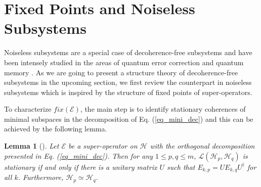 \documentclass[journal]{IEEEtran}
\def\h{\ensuremath{\mathcal{H}}}
\def\l{\ensuremath{\mathcal{L}}}
\def\e{\ensuremath{\mathcal{E}}}
\def\l{\ensuremath{\mathcal{L}}}
\def\l{\mathcal{L}}
\newtheorem{lemma}{Lemma}
\begin{document}
\section{Fixed Points and Noiseless Subsystems}
Noiseless subsystems are a special case of decoherence-free subsystems and have been intensely studied in the areas of quantum error correction \cite{kribs2005operator,beny2007generalization} and quantum memory \cite{kuperberg2003capacity}. As we are going to present a structure theory of decoherence-free subsystems in the upcoming section, we first review the counterpart in noiseless subsystems which is inspired by the structure of fixed points of super-operators.  

To characterize  $fix(\e)$, the main step is to identify stationary coherences of minimal subspaces in  the decomposition of Eq. (\ref{eq_mini_dec}) and this can be achieved  by the following lemma.

\begin{lemma}[\cite{baumgartner2012structure}]\label{Lem_SC}
  Let $\e$ be a super-operator on $\h$ with the orthogonal decomposition presented in Eq. (\ref{eq_mini_dec}). Then for any $1\leq p, q\leq m$, $\l(\h_p,\h_q)$ is stationary if and only if there is a unitary matrix $U$ such that 
  $E_{k,p}=UE_{k,q}U^\dagger$ for all $k$.
  Furthermore, $\h_p\simeq\h_q.$
\end{lemma}
\end{document}
